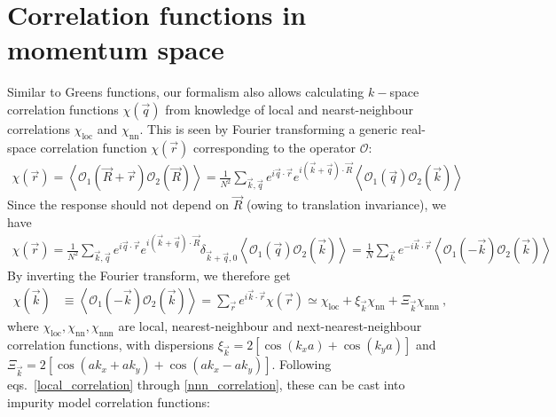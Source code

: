 \documentclass{report}
\numberwithin{equation}{section}
\begin{document}
\section{Correlation functions in momentum space}
Similar to Greens functions, our formalism also allows calculating \(k-\)space correlation functions \(\chi(\vec q)\) from knowledge of local and nearst-neighbour correlations \(\chi_\text{loc}\) and \(\chi_\text{nn}\). This is seen by Fourier transforming a generic real-space correlation function \(\chi(\vec r)\) corresponding to the operator \(\mathcal{O}\):
\begin{equation}\begin{aligned}
	\chi(\vec r) = \left<\mathcal{O}_1 (\vec R + \vec r) \mathcal{O}_2(\vec R)\right> = \frac{1}{N^2}\sum_{\vec k, \vec q} e^{i \vec q \cdot \vec r}e^{i \left(\vec k + \vec q\right) \cdot \vec R}\left<\mathcal{O}_1 (\vec q) \mathcal{O}_2(\vec k)\right>
\end{aligned}\end{equation}
Since the response should not depend on \(\vec R\) (owing to translation invariance), we have
\begin{equation}\begin{aligned}
	\chi(\vec r) = \frac{1}{N^2}\sum_{\vec k, \vec q} e^{i \vec q \cdot \vec r}e^{i \left(\vec k + \vec q\right) \cdot \vec R}\delta_{\vec k + \vec q, 0}\left<\mathcal{O}_1 (\vec q) \mathcal{O}_2(\vec k)\right> = \frac{1}{N}\sum_{\vec k} e^{-i \vec k \cdot \vec r}\left<\mathcal{O}_1 (-\vec k) \mathcal{O}_2(\vec k)\right>
\end{aligned}\end{equation}
By inverting the Fourier transform, we therefore get
\begin{equation}\begin{aligned}
	\chi(\vec k) &\equiv \left<\mathcal{O}_1 (-\vec k) \mathcal{O}_2(\vec k)\right> = \sum_{\vec r}e^{i \vec{k}\cdot\vec{r}} \chi(\vec r) \simeq \chi_\text{loc} + \xi_{\vec k} \chi_\text{nn} + \Xi_{\vec k}\chi_\text{nnn}~,
\end{aligned}\end{equation}
where \(\chi_\text{loc},\chi_\text{nn},\chi_\text{nnn}\) are local, nearest-neighbour and next-nearest-neighbour correlation functions, with dispersions \(\xi_{\vec k} = 2\left[\cos(k_x a) + \cos\left(k_y a\right)\right] \) and \(\Xi_{\vec k} = 2\left[\cos \left(ak_x + ak_y\right) + \cos \left( ak_x - ak_y \right) \right] \). Following eqs.~\ref{local_correlation} through \ref{nnn_correlation}, these can be cast into impurity model correlation functions:
\end{document}
